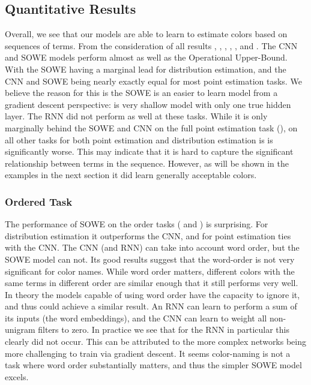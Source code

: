 \documentclass[11pt,a4paper]{article}
\begin{document}
\subsection{Quantitative Results}\label{sec:quantitative-results}

Overall, we see that our models are able to learn to estimate colors based on sequences of terms.
From the consideration of all results , , , , , and .
The CNN and SOWE models perform almost as well as the Operational Upper-Bound.
With the SOWE having a marginal lead for distribution estimation,
and the CNN and SOWE being nearly exactly equal for most point estimation tasks.
We believe the reason for this is the SOWE is an easier to learn model from a gradient descent perspective: is very shallow model with only one true hidden layer.
The RNN did not perform as well at these tasks.
While it is only marginally behind the SOWE and CNN on the full point estimation task (), on all other tasks for both point estimation and distribution estimation is is significantly worse.
This may indicate that it is  hard to capture the significant relationship between terms in the sequence.
However, as will be shown in the examples in the next section it did learn generally acceptable colors.

\subsubsection{Ordered Task}
The performance of SOWE on the order tasks ( and ) is surprising.
For distribution estimation it outperforms the CNN, and for point estimation ties with the CNN.
The CNN (and RNN) can take into account word order, but the SOWE model can not.
Its good results suggest that the word-order is not very significant for color names.
While word order matters, different colors with the same terms in different order are similar enough that it still performs very well.
In theory the models capable of using word order have the capacity to ignore it, and thus could achieve a similar result.
An RNN can learn to perform a sum of its inputs (the word embeddings),
and the CNN can learn to weight all non-unigram filters to zero.
In practice we see that for the RNN in particular this clearly did not occur.
This can be attributed to the more complex networks being more challenging to train via gradient descent.
It seems color-naming is not a task where word order substantially matters,
and thus the simpler SOWE model excels.
\end{document}

